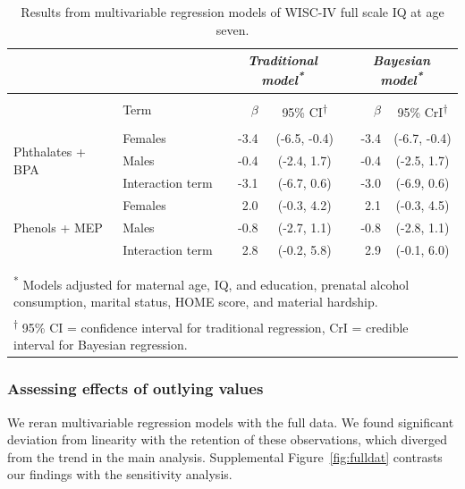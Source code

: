 \begingroup
\renewcommand{\arraystretch}{1.25}
\begin{table}[!ht] \centering 
  \caption[Multivariable regression models of WISC-IV full scale IQ]{Results from multivariable regression models of WISC-IV full scale IQ at age seven.} 
  \label{tab:reg} 
\begin{tabular}{llrcrc} 
& & \multicolumn{2}{c}{\textit{Traditional model\textsuperscript{*}}} & \multicolumn{2}{c}{\textit{Bayesian model\textsuperscript{*}}} \\
\hline 
\\[-3ex] \hline
 & Term & $\beta$ & 95\% CI\textsuperscript{$\dagger$} & $\beta$ & 95\% CrI\textsuperscript{$\dagger$} \\ 
\hline 
\\[-3ex] \hline
\multirow{3}{*}{Phthalates + BPA} & Females & -3.4  & (-6.5, -0.4) &  -3.4 & (-6.7, -0.4) \\ 
                           & Males & -0.4 & (-2.4, 1.7)   &  -0.4 & (-2.5, 1.7) \\ 
                           & Interaction term & -3.1 & (-6.7, 0.6)   &  -3.0 & (-6.9, 0.6) \\ 
\hline
\multirow{3}{*}{Phenols + MEP} & Females          & 2.0   & (-0.3, 4.2) & 2.1 & (-0.3, 4.5) \\ 
                           & Males            & -0.8  & (-2.7, 1.1) & -0.8 & (-2.8, 1.1) \\ 
                           & Interaction term & 2.8   & (-0.2, 5.8) & 2.9 & (-0.1, 6.0) \\ 
\hline 
\\[-3ex] \hline \\[-2.5ex]
\multicolumn{6}{p{0.85\linewidth}}{\textsuperscript{*} Models adjusted for maternal age, IQ, and education, prenatal alcohol consumption, marital status, HOME score, and material hardship.} \\
\multicolumn{6}{p{0.85\linewidth}}{\textsuperscript{$\dagger$} 95\% CI = confidence interval for traditional regression, CrI = credible interval for Bayesian regression.} \\
\end{tabular} 
\end{table} 
\endgroup

\subsubsection{Assessing effects of outlying values}
We reran multivariable regression models with the full data. We found significant deviation from linearity with the retention of these observations, which diverged from the trend in the main analysis. Supplemental Figure~\ref{fig:fulldat} contrasts our findings with the sensitivity analysis.

